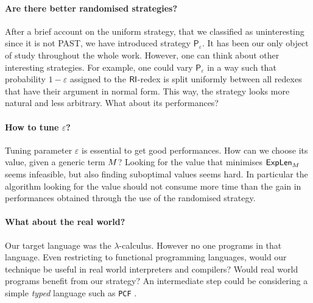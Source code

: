 \paragraph{Are there better randomised strategies?} After a brief account on the uniform strategy, that we classified as uninteresting since it is not PAST, we have introduced strategy $\mathsf{P}_\varepsilon$. It has been our only object of study throughout the whole work. However, one can think about other interesting strategies. For example, one could vary $\mathsf{P}_\varepsilon$ in a way such that probability $1-\varepsilon$ assigned to the $\textsf{RI}$-redex is split uniformly between all redexes that have their argument in normal form. This way, the strategy looks more natural and less arbitrary. What about its performances?
\paragraph{How to tune $\varepsilon$?} Tuning parameter $\varepsilon$ is essential to get good performances. How can we choose its value, given a generic term $M$? Looking for the value that minimises $\textsf{ExpLen}_{M}$ seems infeasible, but also finding suboptimal values seems hard. In particular the algorithm looking for the value should not consume more time than the gain in performances obtained through the use of the randomised strategy.
\paragraph{What about the real world?} Our target language was the $\lambda$-calculus. However no one programs in that language. Even restricting to functional programming languages, would our technique be useful in real world interpreters and compilers? Would real world programs benefit from our strategy? An intermediate step could be considering a simple \emph{typed} language such as \texttt{PCF} \cite{plotkin_lcf_1977}. 